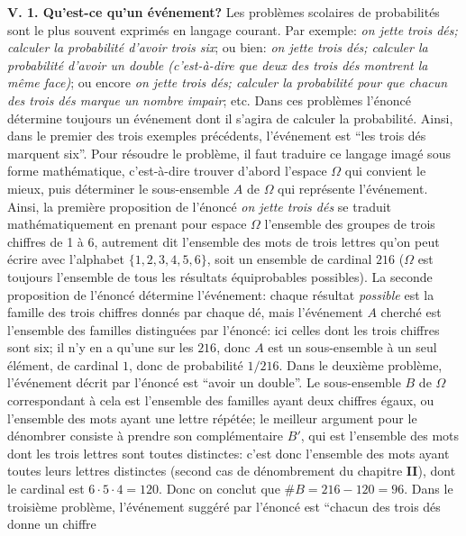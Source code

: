 {\bf V\ata . 1. Qu'est-ce qu'un \'ev\'enement?}
\medskip
Les probl\`emes scolaires de probabilit\'es sont le plus souvent 
exprim\'es en  langage courant. Par exemple: {\sl on jette trois d\'es;
calculer la probabilit\'e d'avoir trois six}; ou bien: {\sl on jette trois 
d\'es; calculer la probabilit\'e d'avoir un double (c'est-\`a-dire que deux
des trois d\'es montrent la  m\^eme face)}; ou encore {\sl on  jette trois
d\'es; calculer  la probabilit\'e pour que chacun des trois d\'es marque un
nombre  impair}; etc. Dans ces probl\`emes l'\'enonc\'e d\'etermine
toujours un \'ev\'enement dont il s'agira de calculer la probabilit\'e. 
Ainsi, dans le premier des trois exemples pr\'ec\'edents, l'\'ev\'enement
est ``les  trois d\'es marquent six''. Pour r\'esoudre le probl\`eme, il faut
traduire ce langage imag\'e sous forme math\'ematique, c'est-\`a-dire
trouver d'abord l'espace $\Omega$ qui convient le mieux, puis 
d\'eterminer le sous-ensemble $A$ de $\Omega$ qui repr\'esente 
l'\'ev\'enement. Ainsi, la premi\`ere proposition de l'\'enonc\'e {\sl on
jette trois d\'es} se traduit math\'ematiquement en prenant pour espace
$\Omega$   l'ensemble des groupes de trois chiffres de 1 \`a 6, autrement
dit l'ensemble des mots de trois lettres qu'on peut \'ecrire avec l'alphabet
$\{ 1, 2, 3,4, 5, 6 \}$, soit un ensemble de cardinal $216$ ($\Omega$ est
toujours l'ensemble de tous les r\'esultats \'equiprobables possibles). 
La seconde proposition de l'\'enonc\'e d\'etermine l'\'ev\'enement:
chaque r\'esultat {\it possible} est la famille des trois chiffres donn\'es
par chaque d\'e, mais l'\'ev\'enement $A$ cherch\'e est
l'ensemble des familles distingu\'ees par l'\'enonc\'e: ici celles dont les
trois chiffres sont six; il n'y en a qu'une sur les $216$, donc $A$ est un
sous-ensemble \`a un seul \'el\'ement, de cardinal $1$, donc de
probabilit\'e $1/216$. Dans le deuxi\`eme probl\`eme, l'\'ev\'enement
d\'ecrit par l'\'enonc\'e est ``avoir un double''. Le sous-ensemble $B$ de
$\Omega$ correspondant \`a cela est l'ensemble des familles ayant deux
chiffres \'egaux, ou l'ensemble des mots ayant une lettre r\'ep\'et\'ee; le
meilleur argument pour le d\'enombrer consiste \`a prendre son
compl\'ementaire $B'$, qui est l'ensemble des mots dont les trois lettres
sont toutes distinctes: c'est donc l'ensemble des mots ayant toutes leurs
lettres distinctes (second cas de d\'enombrement du chapitre {\bf II}),
dont le cardinal est  $6 \cdot 5 \cdot 4 = 120$. Donc on conclut que $\#  
B = 216 - 120 = 96$. Dans le troisi\`eme probl\`eme, l'\'ev\'enement
sugg\'er\'e par l'\'enonc\'e est ``chacun des trois d\'es donne un chiffre
